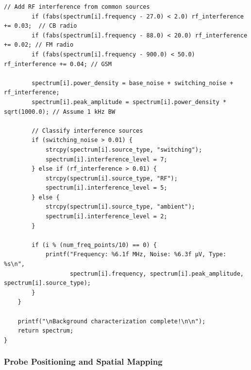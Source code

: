 \documentclass[11pt,a4paper]{article}
\theoremstyle{definition}
\begin{document}
\begin{lstlisting}[caption={Background EM Noise Analysis}]
        // Add RF interference from common sources
        if (fabs(spectrum[i].frequency - 27.0) < 2.0) rf_interference += 0.03;  // CB radio
        if (fabs(spectrum[i].frequency - 88.0) < 20.0) rf_interference += 0.02; // FM radio
        if (fabs(spectrum[i].frequency - 900.0) < 50.0) rf_interference += 0.04; // GSM
        
        spectrum[i].power_density = base_noise + switching_noise + rf_interference;
        spectrum[i].peak_amplitude = spectrum[i].power_density * sqrt(1000.0); // Assume 1 kHz BW
        
        // Classify interference sources
        if (switching_noise > 0.01) {
            strcpy(spectrum[i].source_type, "switching");
            spectrum[i].interference_level = 7;
        } else if (rf_interference > 0.01) {
            strcpy(spectrum[i].source_type, "RF");
            spectrum[i].interference_level = 5;
        } else {
            strcpy(spectrum[i].source_type, "ambient");
            spectrum[i].interference_level = 2;
        }
        
        if (i % (num_freq_points/10) == 0) {
            printf("Frequency: %6.1f MHz, Noise: %6.3f μV, Type: %s\n", 
                   spectrum[i].frequency, spectrum[i].peak_amplitude, spectrum[i].source_type);
        }
    }
    
    printf("\nBackground characterization complete!\n\n");
    return spectrum;
}
\end{lstlisting}

\subsubsection{Probe Positioning and Spatial Mapping}
\end{document}

